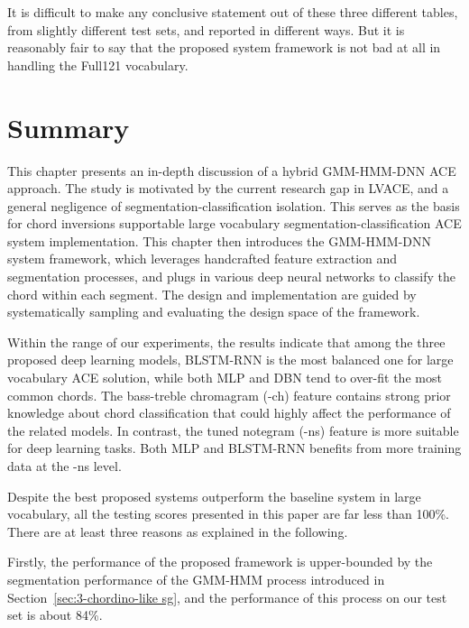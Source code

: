 It is difficult to make any conclusive statement out of these three different tables, from slightly different test sets, and reported in different ways. But it is reasonably fair to say that the proposed system framework is not bad at all in handling the Full121 vocabulary.


\section{Summary} \label{sec:3-concln}
This chapter presents an in-depth discussion of a hybrid GMM-HMM-DNN ACE approach. The study is motivated by the current research gap in LVACE, and a general negligence of segmentation-classification isolation. This serves as the basis for chord inversions supportable large vocabulary segmentation-classification ACE system implementation. This chapter then introduces the GMM-HMM-DNN system framework, which leverages handcrafted feature extraction and segmentation processes, and plugs in various deep neural networks to classify the chord within each segment. The design and implementation are guided by systematically sampling and evaluating the design space of the framework.

Within the range of our experiments, the results indicate that among the three proposed deep learning models, BLSTM-RNN is the most balanced one for large vocabulary ACE solution, while both MLP and DBN tend to over-fit the most common chords. The bass-treble chromagram (-ch) feature contains strong prior knowledge about chord classification that could highly affect the performance of the related models. In contrast, the tuned notegram (-ns) feature is more suitable for deep learning tasks. Both MLP and BLSTM-RNN benefits from more training data at the -ns level.

Despite the best proposed systems outperform the baseline system in large vocabulary, all the testing scores presented in this paper are far less than 100\%. There are at least three reasons as explained in the following.



Firstly, the performance of the proposed framework is upper-bounded by the segmentation performance of the GMM-HMM process introduced in Section~\ref{sec:3-chordino-like sg}, and the performance of this process on our test set is about 84\%.


